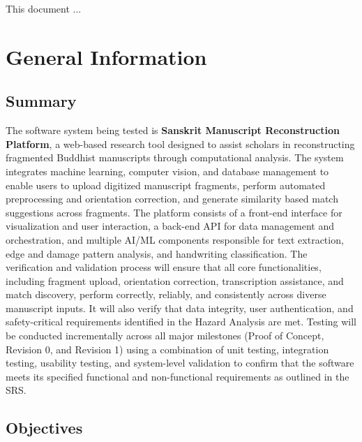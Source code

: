 \documentclass[12pt, titlepage]{article}
\begin{document}

\newpage


This document ... 

\section{General Information}

\subsection{Summary}
The software system being tested is \textbf{Sanskrit Manuscript Reconstruction Platform}, a web-based research tool designed to assist scholars in reconstructing fragmented Buddhist manuscripts through computational analysis. The system integrates machine learning, computer vision, and database management to enable users to upload digitized manuscript fragments, perform automated preprocessing and orientation correction, and generate similarity based match suggestions across fragments. 
\newline
The platform consists of a front-end interface for visualization and user interaction, a back-end API for data management and orchestration, and multiple AI/ML components responsible for text extraction, edge and damage pattern analysis, and handwriting classification.  
\newline
The verification and validation process will ensure that all core functionalities, including fragment upload, orientation correction, transcription assistance, and match discovery, perform correctly, reliably, and consistently across diverse manuscript inputs. It will also verify that data integrity, user authentication, and safety-critical requirements identified in the Hazard Analysis are met. 
\newline
Testing will be conducted incrementally across all major milestones (Proof of Concept, Revision 0, and Revision 1) using a combination of unit testing, integration testing, usability testing, and system-level validation to confirm that the software meets its specified functional and non-functional requirements as outlined in the SRS.
  
\subsection{Objectives}
\end{document}
